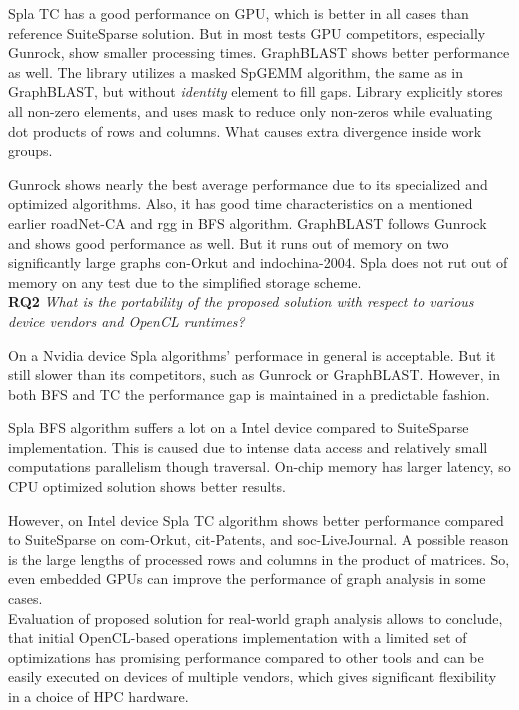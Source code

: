 Spla TC has a good performance on GPU, which is better in all cases than reference SuiteSparse solution. But in most tests GPU competitors, especially Gunrock, show smaller processing times. GraphBLAST shows better performance as well. The library utilizes a masked SpGEMM algorithm, the same as in GraphBLAST, but without \textit{identity} element to fill gaps. Library explicitly stores all non-zero elements, and uses mask to reduce only non-zeros while evaluating dot products of rows and columns. What causes extra divergence inside work groups. 

Gunrock shows nearly the best average performance due to its specialized and optimized algorithms. Also, it has good time characteristics on a mentioned earlier roadNet-CA and rgg in BFS algorithm. GraphBLAST follows Gunrock and shows good performance as well.  But it runs out of memory on two significantly large graphs con-Orkut and indochina-2004. Spla does not rut out of memory on any test due to the simplified storage scheme.\\

\textbf{RQ2} \textit{What is the portability of the proposed solution with respect to various device vendors and OpenCL runtimes?}

On a Nvidia device Spla algorithms' performace in general is acceptable. But it still slower than its competitors, such as Gunrock or GraphBLAST. However, in both BFS and TC the performance gap is maintained in a predictable fashion.

Spla BFS algorithm suffers a lot on a Intel device compared to SuiteSparse implementation. This is caused due to intense data access and relatively small computations parallelism though traversal. On-chip memory has larger latency, so CPU optimized solution shows better results. 

However, on Intel device Spla TC algorithm shows better performance compared to SuiteSparse on com-Orkut, cit-Patents, and soc-LiveJournal. A possible reason is the large lengths of processed rows and columns in the product of matrices. So, even embedded GPUs can improve the performance of graph analysis in some cases.\\

Evaluation of proposed solution for real-world graph analysis allows to conclude, that initial OpenCL-based operations implementation with a limited set of optimizations has promising performance compared to other tools and can be easily executed on devices of multiple vendors, which gives significant flexibility in a choice of HPC hardware. 

